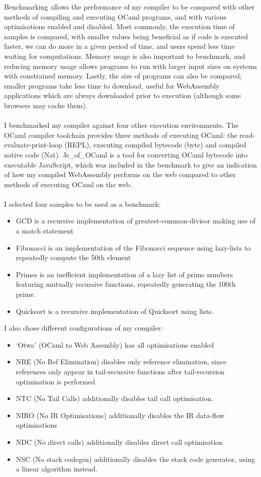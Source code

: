 Benchmarking allows the performance of my compiler to be compared with other methods of compiling and executing OCaml programs, and with various optimisations enabled and disabled. Most commonly, the execution time of samples is compared, with smaller values being beneficial as if code is executed faster, we can do more in a given period of time, and users spend less time waiting for computations. Memory usage is also important to benchmark, and reducing memory usage allows programs to run with larger input sizes on systems with constrained memory. Lastly, the size of programs can also be compared; smaller programs take less time to download, useful for WebAssembly applications which are always downloaded prior to execution (although some browsers may cache them).
\\\\
I benchmarked my compiler against four other execution environments. The OCaml compiler toolchain provides three methods of executing OCaml: the read-evaluate-print-loop (REPL), executing compiled bytecode (byte) and compiled native code (Nat). Js\_of\_OCaml \cite{Js_of_ocaml} is a tool for converting OCaml bytecode into executable JavaScript, which was included in the benchmark to give an indication of how my compiled WebAssembly performs on the web compared to other methods of executing OCaml on the web.
\\\\
I selected four samples to be used as a benchmark:
\begin{itemize}
	\item GCD is a recursive implementation of greatest-common-divisor making use of a match statement
	\item Fibonacci is an implementation of the Fibonacci sequence using lazy-lists to repeatedly compute the 50th element
	\item Primes is an inefficient implementation of a lazy list of prime numbers featuring mutually recursive functions, repeatedly generating the 100th prime.
	\item Quicksort is a recursive implementation of Quicksort using lists.
\end{itemize}
I also chose different configurations of my compiler:
\begin{itemize}
	\item `Otwa' (OCaml to Web Assembly) has all optimisations enabled
	\item NRE (No Ref Elimination) disables only reference elimination, since references only appear in tail-recursive functions after tail-recursion optimisation is performed
	\item NTC (No Tail Calls) additionally disables tail call optimisation.
	\item NIRO (No IR Optimisations) additionally disables the IR data-flow optimisations
	\item NDC (No direct calls) additionally disables direct call optimisation
	\item NSC (No stack codegen) additionally disables the stack code generator, using a linear algorithm instead.
\end{itemize}

